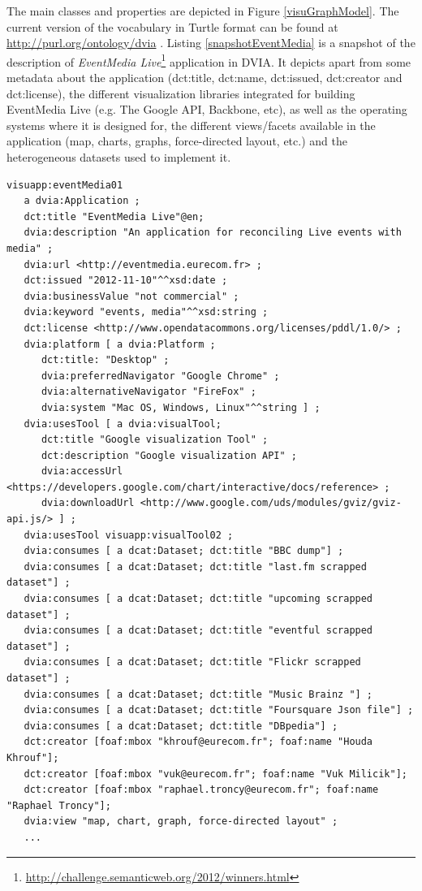 The main classes and properties are depicted in Figure \ref{visuGraphModel}. The current version of the vocabulary in Turtle format can be found at \url{http://purl.org/ontology/dvia} .  Listing \ref{snapshotEventMedia} is a snapshot of the description of \textit{EventMedia Live}\footnote{\url{http://challenge.semanticweb.org/2012/winners.html}} application in DVIA. It depicts apart from some metadata about the application (dct:title, dct:name, dct:issued, dct:creator and dct:license), the different visualization libraries integrated for building EventMedia Live (e.g. The Google API, Backbone, etc), as well as the operating systems where it is designed for, the different views/facets available in the application (map, charts, graphs, force-directed layout, etc.) and the heterogeneous datasets used to implement it.

\begin{lstlisting}
visuapp:eventMedia01
   a dvia:Application ;
   dct:title "EventMedia Live"@en;
   dvia:description "An application for reconciling Live events with media" ;
   dvia:url <http://eventmedia.eurecom.fr> ;
   dct:issued "2012-11-10"^^xsd:date ;
   dvia:businessValue "not commercial" ;
   dvia:keyword "events, media"^^xsd:string ;
   dct:license <http://www.opendatacommons.org/licenses/pddl/1.0/> ;
   dvia:platform [ a dvia:Platform ;
      dct:title: "Desktop" ;
	  dvia:preferredNavigator "Google Chrome" ;
	  dvia:alternativeNavigator "FireFox" ;
	  dvia:system "Mac OS, Windows, Linux"^^string ] ;	
   dvia:usesTool [ a dvia:visualTool;
      dct:title "Google visualization Tool" ;
	  dct:description "Google visualization API" ;
	  dvia:accessUrl <https://developers.google.com/chart/interactive/docs/reference> ;
	  dvia:downloadUrl <http://www.google.com/uds/modules/gviz/gviz-api.js/> ] ;
   dvia:usesTool visuapp:visualTool02 ;
   dvia:consumes [ a dcat:Dataset; dct:title "BBC dump"] ;
   dvia:consumes [ a dcat:Dataset; dct:title "last.fm scrapped dataset"] ;
   dvia:consumes [ a dcat:Dataset; dct:title "upcoming scrapped dataset"] ;
   dvia:consumes [ a dcat:Dataset; dct:title "eventful scrapped dataset"] ;
   dvia:consumes [ a dcat:Dataset; dct:title "Flickr scrapped dataset"] ;
   dvia:consumes [ a dcat:Dataset; dct:title "Music Brainz "] ;
   dvia:consumes [ a dcat:Dataset; dct:title "Foursquare Json file"] ;
   dvia:consumes [ a dcat:Dataset; dct:title "DBpedia"] ;
   dct:creator [foaf:mbox "khrouf@eurecom.fr"; foaf:name "Houda Khrouf"];
   dct:creator [foaf:mbox "vuk@eurecom.fr"; foaf:name "Vuk Milicik"];
   dct:creator [foaf:mbox "raphael.troncy@eurecom.fr"; foaf:name "Raphael Troncy"];
   dvia:view "map, chart, graph, force-directed layout" ;
   ...
\end{lstlisting}

